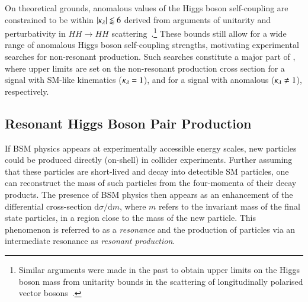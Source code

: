 %
On theoretical grounds, anomalous values of the Higgs boson self-coupling are
constrained to be within $|\kappa_{\lambda}| \lessapprox 6$ derived from arguments of
unitarity and perturbativity in $HH \to HH$
scattering~\cite{DiLuzio:2017tfn}.\footnote{Similar arguments were made in the
  past to obtain upper limits on the Higgs boson mass from unitarity bounds in
  the scattering of longitudinally polarised vector bosons~\cite{Lee:1977eg}.}
These bounds still allow for a wide range of anomalous Higgs boson self-coupling
strengths, motivating experimental searches for non-resonant \HH
production. Such searches constitute a major part of
, where upper limits are set on the
non-resonant \HH production cross section for a signal with SM-like kinematics
($\kappa_{\lambda} = 1$), and for a signal with anomalous \klambda ($\kappa_{\lambda} \neq 1$),
respectively.


\subsection{Resonant Higgs Boson Pair Production}%
\label{sec:bsm_resonant_hh}

If BSM physics appears at experimentally accessible energy scales, new particles
could be produced directly (on-shell) in collider experiments. Further assuming
that these particles are short-lived and decay into detectible SM particles, one
can reconstruct the mass of such particles from the four-momenta of their decay
products. The presence of BSM physics then appears as an enhancement of the
differential cross-section $\mathrm{d}\sigma / \mathrm{d}m$, where $m$ refers to
the invariant mass of the final state particles, in a region close to the mass
of the new particle. This phenomenon is referred to as a \emph{resonance} and
the production of particles via an intermediate resonance as \emph{resonant
  production}.

